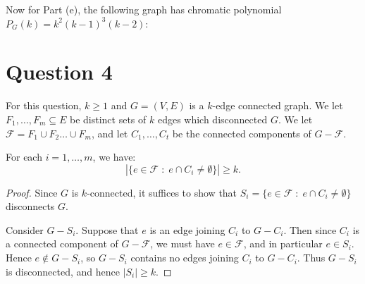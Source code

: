 \documentclass{unswmaths}
\begin{document}
Now for Part (e), the following graph has chromatic polynomial
$P_G(k) = k^2(k-1)^3(k-2)$:
\begin{center}
\end{center}

\section*{Question 4}
For this question, $k \geq 1$ and $G = (V,E)$ is a $k$-edge connected
graph. We let $F_1,\ldots,F_m \subseteq E$ be distinct sets of $k$ edges
which disconnected $G$. We let $\mathcal{F} = F_1\cup F_2\ldots \cup F_m$,
and let $C_1,\ldots,C_t$ be the connected components of $G-\mathcal{F}$.

\begin{lemma}[Part (a)]
\label{4a}
    For each $i = 1,\ldots,m$, we have:
    \begin{equation*}
        |\{e \in \mathcal{F}\;:\;e \cap C_i \neq \emptyset\}| \geq k.
    \end{equation*}
\end{lemma}
\begin{proof}
    Since $G$ is $k$-connected, it suffices to show that $S_i = \{e \in \mathcal{F}\;:\;e \cap C_i \neq \emptyset\}$
    disconnects $G$. 
    
    Consider $G-S_i$. Suppose that $e$ is an edge joining $C_i$ to $G-C_i$. Then
    since $C_i$ is a connected component of $G-\mathcal{F}$, we must have $e \in \mathcal{F}$,
    and in particular $e \in S_i$. Hence $e \notin G-S_i$, so $G-S_i$
    contains no edges joining $C_i$ to $G-C_i$. Thus $G-S_i$ is disconnected, 
    and hence $|S_i| \geq k$.
\end{proof}
\end{document}
